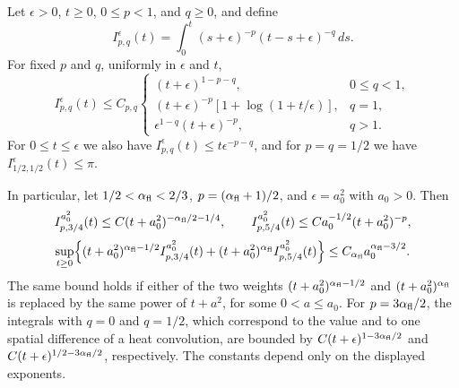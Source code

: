 \begin{lemma}\label{ch13:lem:weighted-convolution}
Let $\epsilon>0$, $t\ge0$, $0\le p<1$, and $q\ge0$, and define
\[
 I_{p,q}^\epsilon(t)=\int_0^t(s+\epsilon)^{-p}(t-s+\epsilon)^{-q}\,ds.
\]
For fixed $p$ and $q$, uniformly in $\epsilon$ and $t$,
\[
 I_{p,q}^\epsilon(t)\le C_{p,q}
 \begin{cases}
 (t+\epsilon)^{1-p-q},&0\le q<1,\\
 (t+\epsilon)^{-p}[1+\log(1+t/\epsilon)],&q=1,\\
 \epsilon^{1-q}(t+\epsilon)^{-p},&q>1.
 \end{cases}
\]
For $0\le t\le\epsilon$ we also have $I_{p,q}^\epsilon(t)\le t\epsilon^{-p-q}$, and for $p=q=1/2$ we have $I_{1/2,1/2}^\epsilon(t)\le\pi$.

In particular, let $1/2<\alpha_{\mathrm{fl}}<2/3$, $p=(\alpha_{\mathrm{fl}}+1)/2$, and $\epsilon=a_0^2$ with $a_0>0$. Then
\[
 I_{p,3/4}^{a_0^2}(t)\le C(t+a_0^2)^{-\alpha_{\mathrm{fl}}/2-1/4},\qquad I_{p,5/4}^{a_0^2}(t)\le Ca_0^{-1/2}(t+a_0^2)^{-p},
\]
\[
 \sup_{t\ge0}\Bigl\{(t+a_0^2)^{\alpha_{\mathrm{fl}}-1/2}I_{p,3/4}^{a_0^2}(t)+(t+a_0^2)^{\alpha_{\mathrm{fl}}}I_{p,5/4}^{a_0^2}(t)\Bigr\}\le C_{\alpha_{\mathrm{fl}}}a_0^{\alpha_{\mathrm{fl}}-3/2}.
\]
The same bound holds if either of the two weights $(t+a_0^2)^{\alpha_{\mathrm{fl}}-1/2}$ and $(t+a_0^2)^{\alpha_{\mathrm{fl}}}$ is replaced by the same power of $t+a^2$, for some $0<a\le a_0$. For $p=3\alpha_{\mathrm{fl}}/2$, the integrals with $q=0$ and $q=1/2$, which correspond to the value and to one spatial difference of a heat convolution, are bounded by $C(t+\epsilon)^{1-3\alpha_{\mathrm{fl}}/2}$ and $C(t+\epsilon)^{1/2-3\alpha_{\mathrm{fl}}/2}$, respectively. The constants depend only on the displayed exponents.
\end{lemma}

